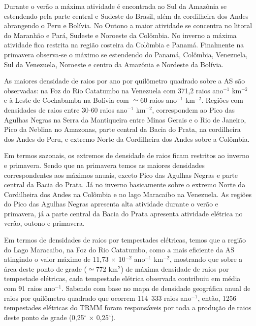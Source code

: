 Durante o verão a máxima atividade é encontrada ao Sul da Amazônia se estendendo pela parte central e Sudeste do Brasil, além da cordilheira dos Andes abrangendo o Peru e Bolívia. No Outono a maior atividade se concentra no litoral do Maranhão e Pará, Sudeste e Noroeste  da Colômbia. No inverno a máxima atividade  fica restrita na região costeira da Colômbia e Panamá. Finalmente na primavera observa-se o máximo se estendendo do Panamá, Colômbia, Venezuela, Sul da Venezuela, Noroeste e centro da Amazônia e Nordeste da Bolívia. 
 
As maiores densidade de raios por ano por quilômetro quadrado sobre a AS são observadas: na Foz do Rio Catatumbo na Venezuela com 371,2 raios ano$^{-1}$ km$^{-2}$ e à Leste de Cochabamba na Bolívia com $\simeq$60 raios ano$^{-1}$ km$^{-2}$. Regiões com densidades de raios entre 30-60 raios ano$^{-1}$ km$^{-2}$, correspondem ao Pico das Agulhas Negras na Serra da Mantiqueira entre Minas Gerais e o Rio de Janeiro, Pico da Neblina no Amazonas, parte central da Bacia do Prata, na cordilheira dos Andes do Peru, e extremo Norte da Cordilheira dos Andes sobre a Colômbia. 

Em termos sazonais, os extremos de densidade de raios ficam restritos ao inverno e primavera. Sendo que na primavera temos as maiores densidades correspondentes aos máximos anuais, exceto Pico das Agulhas Negras e parte central da Bacia do Prata. Já no inverno basicamente sobre o extremo Norte da Cordilheira dos Andes na Colômbia e no lago Maracaibo na Venezuela. As regiões do Pico das Agulhas Negras apresenta alta atividade durante o verão e primavera, já  a parte central da Bacia do Prata apresenta atividade elétrica  no verão, outono e primavera.

Em termos de densidades de raios por tempestades elétricas, temos que a região do Lago Maracaibo, na Foz do Rio Catatumbo, como a mais eficiente da AS atingindo o valor máximo de 11,73 $\times$ 10$^{-2}$ ano$^{-1}$ km$^{-2}$, mostrando que sobre a área deste ponto de grade ($\simeq$772 km$^{2}$) de máxima densidade de raios por tempestade elétricas, cada tempestade elétrica observada contribuiu em média com 91 raios ano$^{-1}$. Sabendo com base no mapa de densidade geográfica anual de raios por quilômetro quadrado que ocorrem 114~333 raios ano$^{-1}$, então,  1256 tempestades elétricas do TRMM foram responsáveis por toda a produção de raios deste ponto de grade (0,25$^{\circ}$ $\times$ 0,25$^{\circ}$).  



